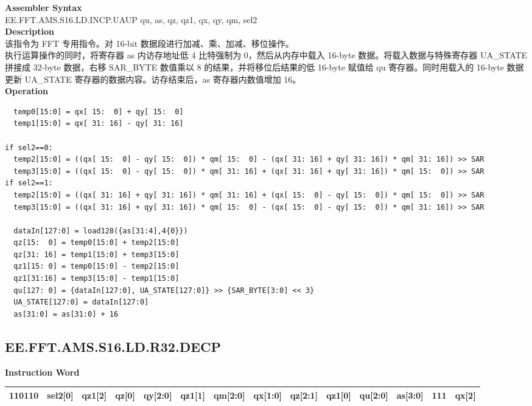\textbf{Assembler Syntax} \\
EE.FFT.AMS.S16.LD.INCP.UAUP qu, as, qz, qz1, qx, qy, qm, sel2 \\
\textbf{Description} \\
该指令为 FFT 专用指令。对 16-bit 数据段进行加减、乘、加减、移位操作。\\
执行运算操作的同时，将寄存器 as 内访存地址低 4 比特强制为 0，然后从内存中载入 16-byte 数据。将载入数据与特殊寄存器 UA\_STATE 拼接成 32-byte 数据，右移 SAR\_BYTE 数值乘以 8 的结果，并将移位后结果的低 16-byte 赋值给 qu 寄存器。同时用载入的 16-byte 数据更新 UA\_STATE 寄存器的数据内容。访存结束后，as 寄存器内数值增加 16。\\
\textbf{Operation}
\begin{lstlisting}
  temp0[15:0] = qx[ 15:  0] + qy[ 15:  0]
  temp1[15:0] = qx[ 31: 16] - qy[ 31: 16]

if sel2==0:
  temp2[15:0] = ((qx[ 15:  0] - qy[ 15:  0]) * qm[ 15:  0] - (qx[ 31: 16] + qy[ 31: 16]) * qm[ 31: 16]) >> SAR
  temp3[15:0] = ((qx[ 15:  0] - qy[ 15:  0]) * qm[ 31: 16] + (qx[ 31: 16] + qy[ 31: 16]) * qm[ 15:  0]) >> SAR
if sel2==1:
  temp2[15:0] = ((qx[ 31: 16] + qy[ 31: 16]) * qm[ 31: 16] + (qx[ 15:  0] - qy[ 15:  0]) * qm[ 15:  0]) >> SAR
  temp3[15:0] = ((qx[ 31: 16] + qy[ 31: 16]) * qm[ 15:  0] - (qx[ 15:  0] - qy[ 15:  0]) * qm[ 31: 16]) >> SAR

  dataIn[127:0] = load128({as[31:4],4{0}})
  qz[15:  0] = temp0[15:0] + temp2[15:0]
  qz[31: 16] = temp1[15:0] + temp3[15:0]
  qz1[15: 0] = temp0[15:0] - temp2[15:0]
  qz1[31:16] = temp3[15:0] - temp1[15:0]
  qu[127: 0] = {dataIn[127:0], UA_STATE[127:0]} >> {SAR_BYTE[3:0] << 3}
  UA_STATE[127:0] = dataIn[127:0]
  as[31:0] = as[31:0] + 16
\end{lstlisting}

\clearpage
\subsection{EE.FFT.AMS.S16.LD.R32.DECP}\label{instruction:EEFFTAMSS16LDR32DECP}
\setlength\tabcolsep{5pt}
\textbf{Instruction Word} \\
\begin{tabular}{|c|c|c|c|c|c|c|c|c|c|c|c|c|c|}
	\hline
	110110 & sel2[0] & qz1[2] & qz[0] & qy[2:0] & qz1[1] & qm[2:0] & qx[1:0] & qz[2:1] & qz1[0] & qu[2:0] & as[3:0] & 111 & qx[2] \\
	\hline
\end{tabular}

